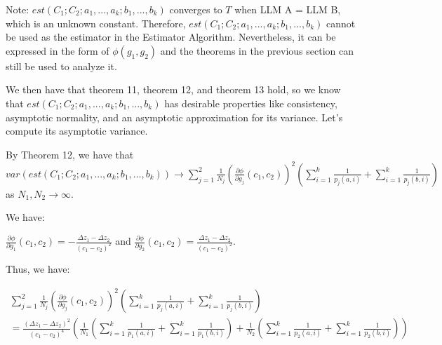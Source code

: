 \documentclass{article}
\begin{document}
Note: $\displaystyle est\left( C_{1} ;C_{2} ;a_{1} ,...,a_{k} ;b_{1} ,...,b_{k}\right)$ converges to $\displaystyle T$ when LLM A = LLM B, which is an unknown constant. Therefore, $\displaystyle est\left( C_{1} ;C_{2} ;a_{1} ,...,a_{k} ;b_{1} ,...,b_{k}\right)$ cannot be used as the estimator in the Estimator Algorithm. Nevertheless, it can be expressed in the form of $\displaystyle \phi \left( g_{1} ,g_{2}\right)$ and the theorems in the previous section can still be used to analyze it.



We then have that theorem 11, theorem 12, and theorem 13 hold, so we know that $\displaystyle est\left( C_{1} ;C_{2} ;a_{1} ,...,a_{k} ;b_{1} ,...,b_{k}\right)$ has desirable properties like consistency, asymptotic normality, and an asymptotic approximation for its variance. Let's compute its asymptotic variance.



By Theorem 12, we have that $\displaystyle var\left( est\left( C_{1} ;C_{2} ;a_{1} ,...,a_{k} ;b_{1} ,...,b_{k}\right)\right)\rightarrow \sum _{j=1}^{2}\frac{1}{N_{j}}\left(\frac{\partial \phi }{\partial g_{j}}\left( c_{1} ,c_{2}\right)\right)^{2}\left(\sum _{i=1}^{k}\frac{1}{p_{j}\left( a,i\right)} +\sum _{i=1}^{k}\frac{1}{p_{j}\left( b,i\right)}\right)$ as $\displaystyle N_{1} ,N_{2}\rightarrow \infty $.

We have:

$\displaystyle \frac{\partial \phi }{\partial g_{1}}\left( c_{1} ,c_{2}\right) =-\frac{\Delta z_{1} -\Delta z_{2}}{\left( c_{1} -c_{2}\right)^{2}}$ and $\displaystyle \frac{\partial \phi }{\partial g_{2}}\left( c_{1} ,c_{2}\right) =\frac{\Delta z_{1} -\Delta z_{2}}{\left( c_{1} -c_{2}\right)^{2}}$.



Thus, we have:

$\displaystyle  \begin{array}{l}
\sum _{j=1}^{2}\frac{1}{N_{j}}\left(\frac{\partial \phi }{\partial g_{j}}\left( c_{1} ,c_{2}\right)\right)^{2}\left(\sum _{i=1}^{k}\frac{1}{p_{j}\left( a,i\right)} +\sum _{i=1}^{k}\frac{1}{p_{j}\left( b,i\right)}\right)\\
=\frac{\left( \Delta z_{1} -\Delta z_{2}\right)^{2}}{\left( c_{1} -c_{2}\right)^{4}}\left(\frac{1}{N_{1}}\left(\sum _{i=1}^{k}\frac{1}{p_{1}\left( a,i\right)} +\sum _{i=1}^{k}\frac{1}{p_{1}\left( b,i\right)}\right) +\frac{1}{N_{2}}\left(\sum _{i=1}^{k}\frac{1}{p_{2}\left( a,i\right)} +\sum _{i=1}^{k}\frac{1}{p_{2}\left( b,i\right)}\right)\right)
\end{array}$
\end{document}
